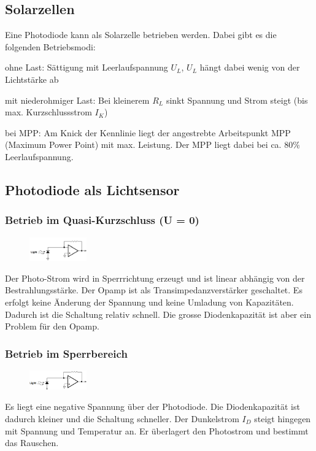 \subsection{Solarzellen}
Eine Photodiode kann als Solarzelle betrieben werden. Dabei gibt es die folgenden Betriebsmodi:
\begin{compactitem}
    \item ohne Last: Sättigung mit Leerlaufspannung $U_L$, $U_L$ hängt dabei wenig von der Lichtstärke ab
    \item mit niederohmiger Last: Bei kleinerem $R_L$ sinkt Spannung und Strom steigt (bis max. Kurzschlussstrom $I_K$)
    \item bei MPP: Am Knick der Kennlinie liegt der angestrebte Arbeitspunkt MPP (Maximum Power Point) mit max. Leistung. Der MPP liegt dabei bei ca. 80\% Leerlaufspannung.
\end{compactitem}

\subsection{Photodiode als Lichtsensor}
\subsubsection{Betrieb im Quasi-Kurzschluss (U = 0)}
\begin{figure}
    \vspace{-12pt}
    \centering
    \includegraphics[width=0.22\textwidth]{images/photodiode_betrieb_01}
\end{figure}
Der Photo-Strom wird in Sperrrichtung erzeugt und ist linear abhängig von der Bestrahlungsstärke. Der Opamp ist als Transimpedanzverstärker geschaltet. Es erfolgt keine Änderung der Spannung und keine Umladung von Kapazitäten. Dadurch ist die Schaltung relativ schnell. Die grosse Diodenkapazität ist aber ein Problem für den Opamp. 

\subsubsection{Betrieb im Sperrbereich}
\begin{figure}
    \vspace{-12pt}
    \centering
    \includegraphics[width=0.22\textwidth]{images/photodiode_betrieb_02}
\end{figure}
Es liegt eine negative Spannung über der Photodiode. Die Diodenkapazität ist dadurch kleiner und die Schaltung schneller. Der Dunkelstrom $I_D$ steigt hingegen mit Spannung und Temperatur an. Er überlagert den Photostrom und bestimmt das Rauschen.

